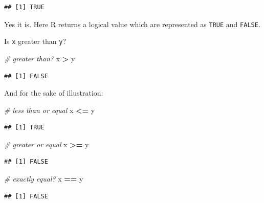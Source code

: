 \documentclass[
]{book}
\newenvironment{Shaded}{\begin{snugshade}}{\end{snugshade}}
\newcommand{\CommentTok}[1]{\textcolor[rgb]{0.56,0.35,0.01}{\textit{#1}}}
\newcommand{\NormalTok}[1]{#1}
\newcommand{\OperatorTok}[1]{\textcolor[rgb]{0.81,0.36,0.00}{\textbf{#1}}}
\newcommand{\StringTok}[1]{\textcolor[rgb]{0.31,0.60,0.02}{#1}}
\begin{document}
\begin{verbatim}
## [1] TRUE
\end{verbatim}

Yes it is. Here R returns a logical value which are represented as \texttt{TRUE} and \texttt{FALSE}.

Is \texttt{x} greater than \texttt{y}?

\begin{Shaded}
\begin{Highlighting}[]
\CommentTok{\# greater than?}
\NormalTok{x }\OperatorTok{\textgreater{}}\StringTok{ }\NormalTok{y}
\end{Highlighting}
\end{Shaded}

\begin{verbatim}
## [1] FALSE
\end{verbatim}

And for the sake of illustration:

\begin{Shaded}
\begin{Highlighting}[]
\CommentTok{\# less than or equal}
\NormalTok{x }\OperatorTok{\textless{}=}\StringTok{ }\NormalTok{y}
\end{Highlighting}
\end{Shaded}

\begin{verbatim}
## [1] TRUE
\end{verbatim}

\begin{Shaded}
\begin{Highlighting}[]
\CommentTok{\# greater or equal}
\NormalTok{x }\OperatorTok{\textgreater{}=}\StringTok{ }\NormalTok{y}
\end{Highlighting}
\end{Shaded}

\begin{verbatim}
## [1] FALSE
\end{verbatim}

\begin{Shaded}
\begin{Highlighting}[]
\CommentTok{\# exactly equal?}
\NormalTok{x }\OperatorTok{==}\StringTok{ }\NormalTok{y}
\end{Highlighting}
\end{Shaded}

\begin{verbatim}
## [1] FALSE
\end{verbatim}
\end{document}

